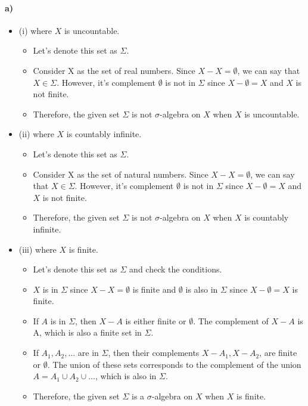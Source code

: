 \documentclass[12pt]{article}
\begin{document}
\paragraph*{a)}
\begin{itemize}
    \item (i) where $X$ is uncountable.
    \begin{itemize}
        \item Let's denote this set as $\Sigma$.
        \item Consider X as the set of real numbers. Since $X-X = \emptyset$, we can say that $X \in \Sigma$. However, it's complement $\emptyset$ is not in $\Sigma$ since $X-\emptyset = X$ and $X$ is not finite.
        \item Therefore, the given set $\Sigma$ is not $\sigma$-algebra on $X$ when $X$ is uncountable.
    \end{itemize}
    \item (ii) where $X$ is countably infinite.
    \begin{itemize}
        \item Let's denote this set as $\Sigma$.
        \item Consider X as the set of natural numbers. Since $X-X = \emptyset$, we can say that $X \in \Sigma$. However, it's complement $\emptyset$ is not in $\Sigma$ since $X-\emptyset = X$ and $X$ is not finite.
        \item Therefore, the given set $\Sigma$ is not $\sigma$-algebra on $X$ when $X$ is countably infinite.
    \end{itemize}
    \item (iii) where $X$ is finite.
    \begin{itemize}
        \item Let's denote this set as $\Sigma$ and check the conditions.
        \item $X$ is in $\Sigma$ since $X-X=\emptyset$ is finite and $\emptyset$ is also in $\Sigma$ since $X-\emptyset = X$ is finite.
        \item If $A$ is in $\Sigma$, then $X-A$ is either finite or $\emptyset$. The complement of $X-A$ is A, which is also a finite set in $\Sigma$.
        \item If $A_1,A_2,...$ are in $\Sigma$, then their complements $X-A_1,X-A_2$, are finite or $\emptyset$. The union of these sets corresponds to the complement of the union $A=A_1\cup A_2\cup...$, which is also in $\Sigma$.
        \item Therefore, the given set $\Sigma$ is a $\sigma$-algebra on $X$ when $X$ is finite.
    \end{itemize}
\end{itemize}
\end{document}

